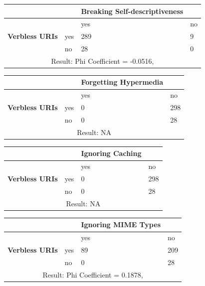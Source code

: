 \documentclass[a4paper,12pt]{article}
\begin{document}
\begin{center}
  \begin{tabular}{| p{60mm} | p{10mm} | p{35mm} | p{35mm} |}
  \hline
   & & \textbf{Breaking Self-descriptiveness} &
  \\
  \hline
  & & yes & no
  \\
  \hline
  \textbf{Verbless URIs} & yes & 289 & 9
  \\
  \hline
   & no & 28 & 0
  \\
  \hline
  \multicolumn{4}{|c|}{Result: Phi Coefficient = -0.0516, }
  \\ \hline
  \end{tabular}
  \end{center}

\begin{center}
  \begin{tabular}{| p{60mm} | p{10mm} | p{35mm} | p{35mm} |}
  \hline
   & & \textbf{Forgetting Hypermedia} &
  \\
  \hline
  & & yes & no
  \\
  \hline
  \textbf{Verbless URIs} & yes & 0 & 298
  \\
  \hline
   & no & 0 & 28
  \\
  \hline
  \multicolumn{4}{|c|}{Result: NA}
  \\ \hline
  \end{tabular}
  \end{center}

\begin{center}
  \begin{tabular}{| p{60mm} | p{10mm} | p{35mm} | p{35mm} |}
  \hline
   & & \textbf{Ignoring Caching} &
  \\
  \hline
  & & yes & no
  \\
  \hline
  \textbf{Verbless URIs} & yes & 0 & 298
  \\
  \hline
   & no & 0 & 28
  \\
  \hline
  \multicolumn{4}{|c|}{Result: NA}
  \\ \hline
  \end{tabular}
  \end{center}

\begin{center}
  \begin{tabular}{| p{60mm} | p{10mm} | p{35mm} | p{35mm} |}
  \hline
   & & \textbf{Ignoring MIME Types} &
  \\
  \hline
  & & yes & no
  \\
  \hline
  \textbf{Verbless URIs} & yes & 89 & 209
  \\
  \hline
   & no & 0 & 28
  \\
  \hline
  \multicolumn{4}{|c|}{Result: Phi Coefficient = 0.1878, }
  \\ \hline
  \end{tabular}
  \end{center}
\end{document}
